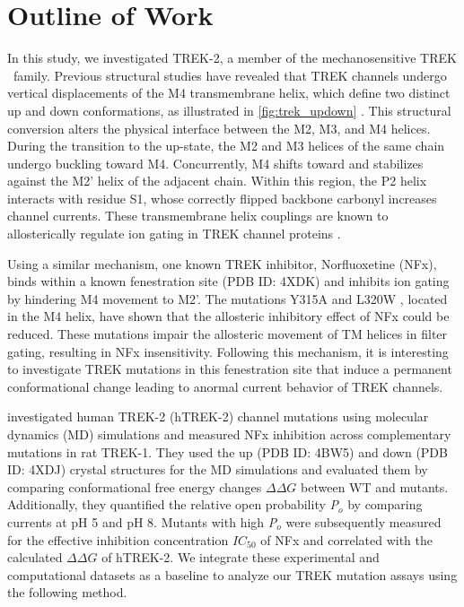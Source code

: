 \section{Outline of Work}\label{intro:outline}
In this study, we investigated TREK-2, a member of the mechanosensitive TREK \KtwoP\ family. Previous structural studies have revealed that TREK channels undergo vertical displacements of the M4 transmembrane helix, which define two distinct up and down conformations, as illustrated in \autoref{fig:trek_updown} \parencite{nataleStructuralInsightsMechanisms2021, schmidpeterMembranePhospholipidsControl2023, turkaydinAtomisticMechanismCoupling2024}. This structural conversion alters the physical interface between the M2, M3, and M4 helices. During the transition to the up-state, the M2 and M3 helices of the same chain undergo buckling toward M4. Concurrently, M4 shifts toward and stabilizes against the M2' helix of the adjacent chain. Within this region, the P2 helix interacts with residue S1, whose correctly flipped backbone carbonyl increases channel currents. These transmembrane helix couplings are known to allosterically regulate ion gating in TREK channel proteins \parencite{proksNorfluoxetineInhibitsTREK22021, turkaydinAtomisticMechanismCoupling2024}.

Using a similar mechanism, one known TREK inhibitor, Norfluoxetine (NFx), binds within a known fenestration site (PDB ID: 4XDK) and inhibits ion gating by hindering M4 movement to M2'.  The mutations Y315A \parencite{proksNorfluoxetineInhibitsTREK22021} and L320W \parencite{dongK2PChannelGating2015}, located in the M4 helix, have shown that the allosteric inhibitory effect of NFx could be reduced. These mutations impair the allosteric movement of TM helices in filter gating, resulting in NFx insensitivity. Following this mechanism, it is interesting to investigate TREK mutations in this fenestration site that induce a permanent conformational change leading to anormal current behavior of TREK channels. 

\Textcite{musinszkiUpstateTransitionDefault2026} investigated human TREK-2 (hTREK-2) channel mutations using molecular dynamics (MD) simulations and measured NFx inhibition across complementary mutations in rat TREK-1. They used the up (PDB ID: 4BW5) and down (PDB ID: 4XDJ) crystal structures for the MD simulations and evaluated them by comparing conformational free energy changes $\Delta\Delta G$ between WT and mutants. Additionally, they quantified the relative open probability \textit{P$_o$} by comparing currents at pH 5 and pH 8. Mutants with high \textit{P$_o$} were subsequently measured for the effective inhibition concentration $IC_{50}$ of NFx and correlated with the calculated $\Delta\Delta G$ of hTREK-2. We integrate these experimental and computational datasets as a baseline to analyze our TREK mutation assays using the following method.
